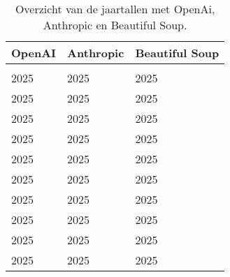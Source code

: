 \begin{table}[h!]
    \tiny
    \caption{Overzicht van de jaartallen met OpenAi, Anthropic en Beautiful Soup.}
    \centering
    \begin{adjustbox}{width=1.2\textwidth,center}
    \begin{tabularx}{\textwidth}{|X|X|X|} 
        \hline
        \rowcolor{lightgray}
        OpenAI & Anthropic & Beautiful Soup \\ 
        \hline
        \rowcolor{lightgray}
        \multicolumn{3}{|X|}{Jaar}\\ 
        \hline
        2025 & 2025 & 2025\\ 
        2025 & 2025 & 2025\\
        2025 & 2025 & 2025\\
        2025 & 2025 & 2025\\
        2025 & 2025 & 2025\\
        2025 & 2025 & 2025\\
        2025 & 2025 & 2025\\
        2025 & 2025 & 2025\\
        2025 & 2025 & 2025\\
        2025 & 2025 & 2025\\
        \hline
    \end{tabularx}
\end{adjustbox}
    \label{table:llmJaar}
\end{table}
